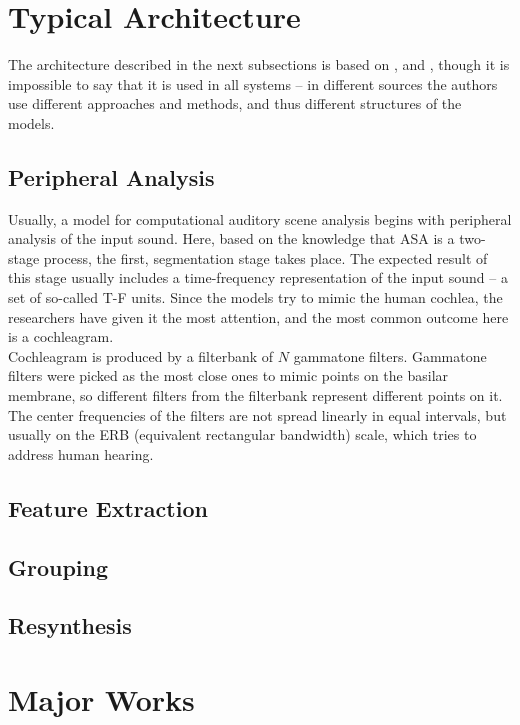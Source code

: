 \section{Typical Architecture}

The architecture described in the next subsections is based on \cite{Wang2006}, \cite{Jasti2020} and \cite{Virtanen2012}, though it is impossible to say that it is used in all systems -- in different sources the authors use different approaches and methods, and thus different structures of the models.

\subsection{Peripheral Analysis}

Usually, a model for computational auditory scene analysis begins with peripheral analysis of the input sound. Here, based on the knowledge that ASA is a two-stage process, the first, segmentation stage takes place. The expected result of this stage usually includes a time-frequency representation of the input sound -- a set of so-called T-F units. Since the models try to mimic the human cochlea, the researchers have given it the most attention, and the most common outcome here is a cochleagram.\\

Cochleagram is produced by a filterbank of $N$ gammatone filters. Gammatone filters were picked as the most close ones to mimic points on the basilar membrane, so different filters from the filterbank represent different points on it. The center frequencies of the filters are not spread linearly in equal intervals, but usually on the ERB (equivalent rectangular bandwidth) scale, which tries to address human hearing.

\subsection{Feature Extraction}
\subsection{Grouping}
\subsection{Resynthesis}



\section{Major Works}
